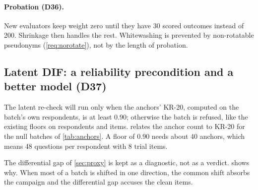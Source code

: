 \paragraph{Probation (D36).} New evaluators keep weight zero until they have 30 scored outcomes
instead of 200. Shrinkage then handles the rest. Whitewashing is prevented by non-rotatable
pseudonyms (\cref{req:norotate}), not by the length of probation.

\subsection{Latent DIF: a reliability precondition and a better model (D37)}

The latent re-check will run only when the anchors' KR-20, computed on the batch's own
respondents, is at least $0.90$; otherwise the batch is refused, like the existing floors on
respondents and items.  relates the anchor count to KR-20 for the null batches
of \cref{tab:anchors}. A floor of $0.90$ needs about 40 anchors, which means 48 questions per
respondent with 8 trial items.

\begin{table}[t]
\centering\small
\caption{KR-20 of the anchor total and its true reliability (squared correlation with $\theta$)
for the null batches of \cref{tab:anchors} ($N=6000$, four datasets). Source:
\texttt{scripts/revisions\_dif.py}.}
\label{tab:rev-kr20}
\end{table}

The differential gap of \cref{sec:proxy} is kept as a diagnostic, not as a verdict.
 shows why. When most of a batch is shifted in one direction, the common
shift absorbs the campaign and the differential gap accuses the clean items.

